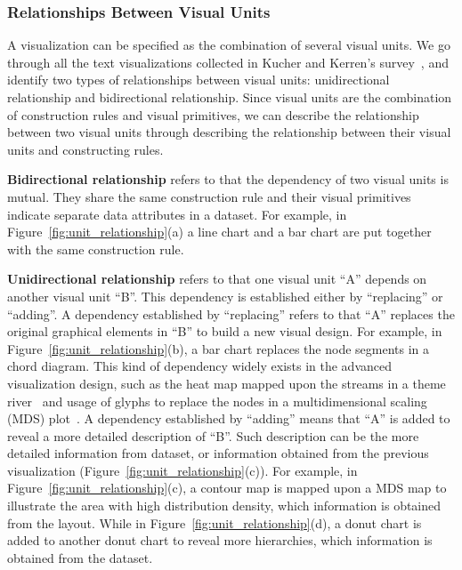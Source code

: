 \subsubsection{Relationships Between Visual Units}
A visualization can be specified as the combination of several visual units. 
We go through all the text visualizations collected in Kucher and Kerren's survey~\cite{kucher2015text}, and identify two types of relationships between visual units: unidirectional relationship and bidirectional relationship. Since visual units are the combination of construction rules and visual primitives, we can describe the relationship between two visual units through describing the relationship between their visual units and constructing rules.  

\textbf{Bidirectional relationship} refers to that the dependency of two visual units is mutual. They share the same construction rule and their visual primitives indicate separate data attributes in a dataset.
For example, in Figure~\ref{fig:unit_relationship}(a) a line chart and  a bar chart are put together with the same construction rule. 

\textbf{Unidirectional relationship} refers to that one visual unit ``A'' depends on another visual unit ``B''.  This dependency is established either by ``replacing'' or ``adding''. A dependency established by ``replacing'' refers to that ``A'' replaces the original graphical elements in ``B'' to build a new visual design. For example, in Figure~\ref{fig:unit_relationship}(b), a bar chart replaces the node segments in a chord diagram. This kind of dependency widely exists in the advanced visualization design, such as the heat map mapped upon the streams in a theme river~\cite{wu_opinionflow:_2014}  and usage of glyphs to replace the nodes in a multidimensional scaling (MDS) plot~\cite{chen_peakvizor:_2016}. A dependency established by ``adding'' means that ``A'' is added to reveal a more detailed description of ``B''. Such description can be the more detailed information from dataset, or information obtained from the previous visualization (Figure~\ref{fig:unit_relationship}(c)). For example, in Figure~\ref{fig:unit_relationship}(c), a contour map is mapped upon a MDS map to illustrate the area with high distribution density, which information is obtained from the layout. While in Figure~\ref{fig:unit_relationship}(d), a donut chart is added to another donut chart to reveal more hierarchies, which information is obtained from the dataset. 


